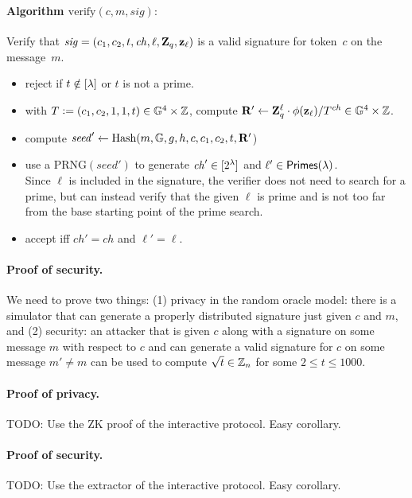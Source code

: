 \documentclass[11pt]{article}
\begin{document}
\paragraph{Algorithm $\text{verify}(c, m, \mathit{sig}):$}
Verify that $\mathit{sig} = (c_1, c_2, t, \mathit{ch}, \ell, \mathbf{Z}_q, \mathbf{z}_\ell)$ 
is a valid signature for token~$c$ on the message~$m$.
\begin{itemize}
\item reject if $t \notin [{\lambda}]$ or $t$ is not a prime.

\item with $T \mathrel{\mathop:}= (c_1, c_2, 1, 1, t) \in \mathbb G^4 \times \mathbb Z$, 
compute $\mathbf{R}' \gets \mathbf{Z}_q^\ell \cdot \phi(\mathbf{z}_\ell) / T^\mathit{ch} \in \mathbb G^4 \times \mathbb Z$.

\item compute $\mathit{seed}' \gets \text{Hash}(m, \mathbb G, g, h, c, c_1, c_2, t, \mathbf{R}'$)

\item use a $\text{PRNG}(\mathit{seed}')$ to generate 
  $\mathit{ch}' \in [{2^\lambda}]$ and $\ell' \in \textsf{Primes}(\lambda)$. \\
Since $\ell$ is
  included in the signature, the verifier does not need to search for
  a prime, but can instead verify that the given $\ell$ is prime and
  is not too far from the base starting point of the prime search.

\item accept iff $\mathit{ch}' = \mathit{ch}$ and $\ell' = \ell$.
\end{itemize}



\paragraph{Proof of security.}
We need to prove two things: 
(1) privacy in the random oracle model:
there is a simulator that can generate a properly distributed
signature just given $c$ and $m$, and 
(2) security: an attacker that is given $c$ along with a 
signature on some message $m$
with respect to $c$ and can generate a valid signature for $c$ on
some message $m' \neq m$ can be used to compute $\sqrt{t} \in \mathbb Z_n$
for some $2 \leq t \leq 1000$. 

\paragraph{Proof of privacy.}
TODO: Use the ZK proof of the interactive protocol. Easy corollary.


\paragraph{Proof of security.}
TODO: Use the extractor of the interactive protocol. Easy corollary.
 





\end{document}
